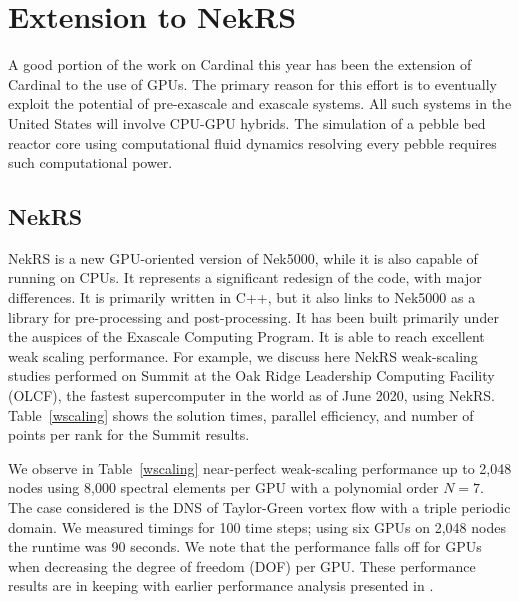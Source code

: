 \section{Extension to NekRS}
\label{s:nrs}

A good portion of the work on Cardinal this year has been the extension of Cardinal to the use of GPUs. The primary reason for this effort is to eventually exploit the potential of pre-exascale and exascale systems.
All such systems in the United States will involve CPU-GPU hybrids. The simulation of a pebble bed reactor core using computational fluid dynamics resolving every pebble requires such computational power.

\subsection{NekRS}

NekRS is a new GPU-oriented version of Nek5000, while it is also capable of running on CPUs. It represents a significant redesign of the code, with major differences. It is primarily written in C++, but it also links to Nek5000 as a library for pre-processing and post-processing. It has been built primarily under the auspices of the Exascale Computing Program. It is able to reach excellent weak scaling performance. For example, we discuss here NekRS weak-scaling studies performed on Summit at the Oak Ridge Leadership Computing Facility (OLCF), the fastest supercomputer in the world as of June 2020, using NekRS. Table~\ref{wscaling} shows the solution times, parallel efficiency, and number of points per rank for the Summit results.

We observe in Table~\ref{wscaling} near-perfect weak-scaling performance up to 2,048 nodes using 8,000 spectral elements per GPU with a polynomial order  $N=7$. The case considered is the DNS of Taylor-Green vortex flow with a triple periodic domain. We measured timings for 100 time steps; using six GPUs on 2,048 nodes the runtime was 90 seconds. 
We note that the performance falls off for GPUs when decreasing the degree of freedom (DOF) per GPU.  
These performance results are in keeping with earlier performance analysis presented in \cite{fischer15,min2015a}.

